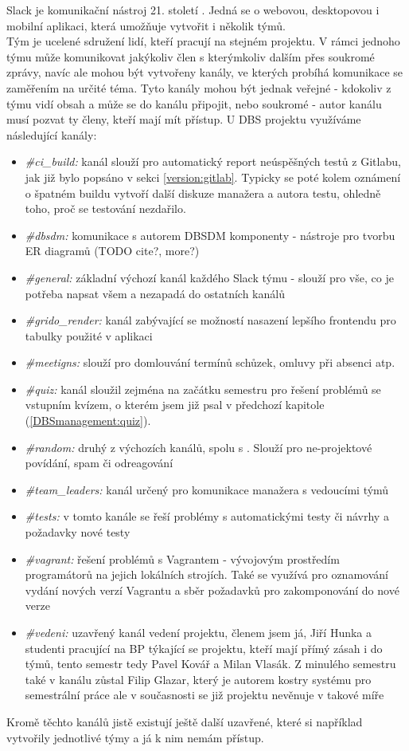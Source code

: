 Slack je komunikační nástroj 21. století \cite{slack}. Jedná se o webovou, desktopovou i mobilní aplikaci, která umožňuje vytvořit i několik týmů.\\
Tým je ucelené sdružení lidí, kteří pracují na stejném projektu. V rámci jednoho týmu může komunikovat jakýkoliv člen s kterýmkoliv dalším přes soukromé zprávy, navíc ale mohou být vytvořeny kanály, ve kterých probíhá komunikace se zaměřením na určité téma. Tyto kanály mohou být jednak veřejné - kdokoliv z týmu vidí obsah a může se do kanálu připojit, nebo soukromé - autor kanálu musí pozvat ty členy, kteří mají mít přístup. U DBS projektu využíváme následující kanály:
\begin{itemize}
	\item \emph{\#ci\_build:} kanál slouží pro automatický report neúspěšných testů z Gitlabu, jak již bylo popsáno v sekci \ref{version:gitlab}. Typicky se poté kolem oznámení o špatném buildu vytvoří další diskuze manažera a autora testu, ohledně toho, proč se testování nezdařilo.
	\item \emph{\#dbsdm:} komunikace s autorem DBSDM komponenty - nástroje pro tvorbu ER diagramů (TODO cite?, more?)
	\item \emph{\#general:} základní výchozí kanál každého Slack týmu - slouží pro vše, co je potřeba napsat všem a nezapadá do ostatních kanálů
	\item \emph{\#grido\_render:} kanál zabývající se možností nasazení lepšího frontendu pro tabulky použité v aplikaci
	\item \emph{\#meetigns:} slouží pro domlouvání termínů schůzek, omluvy při absenci atp.
	\item \emph{\#quiz:} kanál sloužil zejména na začátku semestru pro řešení problémů se vstupním kvízem, o kterém jsem již psal v předchozí kapitole (\ref{DBSmanagement:quiz}).
	\item \emph{\#random:} druhý z výchozích kanálů, spolu s . Slouží pro ne-projektové povídání, spam či odreagování
	\item \emph{\#team\_leaders:} kanál určený pro komunikace manažera s vedoucími týmů
	\item \emph{\#tests:} v tomto kanále se řeší problémy s automatickými testy či návrhy a požadavky nové testy
	\item \emph{\#vagrant:} řešení problémů s Vagrantem - vývojovým prostředím programátorů na jejich lokálních strojích. Také se využívá pro oznamování vydání nových verzí Vagrantu a sběr požadavků pro zakomponování do nové verze
	\item \emph{\#vedeni:} uzavřený kanál vedení projektu, členem jsem já, Jiří Hunka a studenti pracující na BP týkající se projektu, kteří mají přímý zásah i do týmů, tento semestr tedy Pavel Kovář a Milan Vlasák. Z minulého semestru také v kanálu zůstal Filip Glazar, který je autorem kostry systému pro semestrální práce ale v současnosti se již projektu nevěnuje v takové míře
\end{itemize}
Kromě těchto kanálů jistě existují ještě další uzavřené, které si například vytvořily jednotlivé týmy a já k nim nemám přístup.

